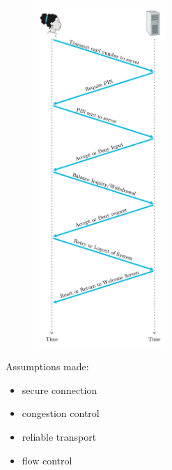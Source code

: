 \documentclass[12pt]{article}
\begin{document}
\begin{enumerate}
    \newpage
    \begin{figure}[h!]
    \centering
    \includegraphics[width=0.45\textwidth]{Fig1.P1.png}
    \end{figure}
Assumptions made:
\begin{itemize}
    \item secure connection
    \item congestion control
    \item reliable transport
    \item flow control
\end{itemize}


\end{enumerate}
\end{document}
